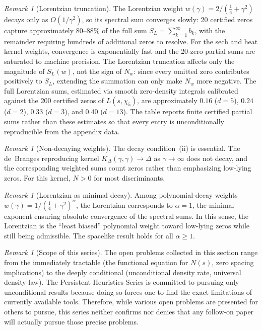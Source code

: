 \documentclass[12pt,reqno]{amsart}
\theoremstyle{plain}
\theoremstyle{definition}
\theoremstyle{remark}
\newtheorem{remark}[theorem]{Remark}
\newcommand{\quarter}{\tfrac{1}{4}}
\begin{document}
\begin{remark}[Lorentzian truncation]\label{rem:lorentzian-truncation}
The Lorentzian weight $w(\gamma) = 2/(\frac{1}{4} + \gamma^2)$ decays only as $O(1/\gamma^2)$, so its spectral sum converges slowly: 20 certified zeros capture approximately $80$--$88\%$ of the full sum $S_L = \sum_{k=1}^\infty b_k$, with the remainder requiring hundreds of additional zeros to resolve.  For the sech and heat kernel weights, convergence is exponentially fast and the 20-zero partial sums are saturated to machine precision.  The Lorentzian truncation affects only the magnitude of $S_L(w)$, not the sign of $N_w$: since every omitted zero contributes positively to $S_L$, extending the summation can only make $N_w$ more negative.  The full Lorentzian sums, estimated via smooth zero-density integrals calibrated against the 200 certified zeros of $L(s,\chi_5)$, are approximately $0.16$ ($d = 5$), $0.24$ ($d = 2$), $0.33$ ($d = 3$), and $0.40$ ($d = 13$).  The table reports finite certified partial sums rather than these estimates so that every entry is unconditionally reproducible from the appendix data.
\end{remark}

\begin{remark}[Non-decaying weights]
The decay condition~(ii) is essential. The de~Branges reproducing kernel $K_\Delta(\gamma, \gamma) \to \Delta$ as $\gamma \to \infty$ does not decay, and the corresponding weighted sums count zeros rather than emphasizing low-lying zeros. For this kernel, $N > 0$ for most discriminants.
\end{remark}

\begin{remark}[Lorentzian as minimal decay]
Among polynomial-decay weights $w(\gamma) = 1/(\quarter + \gamma^2)^\alpha$, the Lorentzian corresponds to $\alpha = 1$, the minimal exponent ensuring absolute convergence of the spectral sums. In this sense, the Lorentzian is the ``least biased'' polynomial weight toward low-lying zeros while still being admissible. The spacelike result holds for all $\alpha \geq 1$.
\end{remark}

\begin{remark}[Scope of this series]\label{rem:scope}
The open problems collected in this section range from the immediately tractable (the
functional equation for $N(s)$, zero spacing implications) to the deeply conditional
(unconditional density rate, universal density law).  The Persistent Heuristics Series is committed to pursuing only unconditional results because doing so forces one to find the exact limitations of currently available tools.  Therefore, while various open problems are presented for others to pursue, this series neither confirms nor denies that any follow-on paper will actually pursue those precise problems.
\end{remark}
\end{document}

